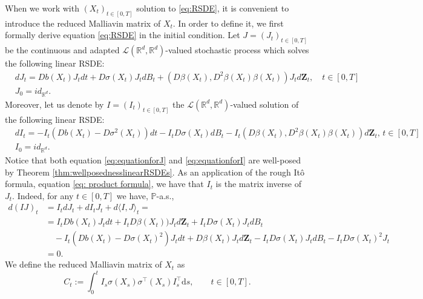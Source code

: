 \documentclass[11pt,a4paper]{article}
\newcommand{\R}{\mathbb{R}}
\newcommand{\rd}{\mathrm{d}}
\theoremstyle{plain}
\begin{document}
When we work with $(X_t)_{t\in[0,T]}$ solution to \eqref{eq:RSDE}, it is convenient to introduce the reduced Malliavin matrix of $X_t$. In order to define it, we first formally derive equation \eqref{eq:RSDE} in the initial condition.
Let $J=(J_t)_{t \in [0,T]}$ be the continuous and adapted $\mathscr{L}(\R^d,\R^d)$-valued stochastic process which solves the following linear RSDE: \begin{equation} \label{eq:equationforJ}\begin{aligned} &dJ_t=Db(X_t)J_tdt+D\sigma(X_t)J_tdB_t+(D\beta(X_t),D^2\beta(X_t)\beta(X_t))J_td\mathbf{Z}_t, \quad t \in [0,T] \\ &J_0=id_{\R^d}.\end{aligned}\end{equation} 
Moreover, let us denote by $I=(I_t)_{t \in [0,T]}$ the $\mathscr{L}(\R^d,\R^d)$-valued solution of the following linear RSDE:
\begin{equation} \label{eq:equationforI}\begin{aligned} &dI_t=-I_t(Db(X_t)-D\sigma^2(X_t))dt-I_tD\sigma(X_t)dB_t-I_t(D\beta(X_t),D^2\beta(X_t)\beta(X_t))d\mathbf{Z}_t, \, t \in [0,T] \\ &I_0=id_{\R^d}. \end{aligned}\end{equation}
Notice that both equation \eqref{eq:equationforJ} and \eqref{eq:equationforI} are well-posed by Theorem \ref{thm:wellposednesslinearRSDEs}.
As an application of the rough It\^o formula, equation \eqref{eq: product formula}, we have that $I_t$ is the matrix inverse of $J_t$. Indeed,
for any $t \in [0,T]$ we have, $\mathbb{P}$-a.s.,
\begin{equation*}
    \begin{aligned}
        d(I J)_t &= I_t dJ_t + dI_t J_t + d\langle I,J\rangle_t =  \\ &= I_tDb(X_t)J_tdt+I_tD\beta(X_t))J_td\mathbf{Z}_t+I_t D\sigma(X_t)J_tdB_t \\ & \quad -I_t(Db(X_t)-D\sigma(X_t)^2)J_t dt+D\beta(X_t)J_td\mathbf{Z}_t-I_tD\sigma(X_t)J_tdB_t - I_t D\sigma(X_t)^2 J_t \\ &= 0. 
    \end{aligned}
\end{equation*} 
We define the reduced Malliavin matrix of $X_t$ as
\begin{equation}
    \label{eq: reduced malliavin matrix}
    C_t := \int_{0}^t I_s \sigma(X_s)\sigma^{\top}(X_s) I_s^{\top} \rd s, \qquad t\in[0,T].
    \end{equation}
\end{document}
